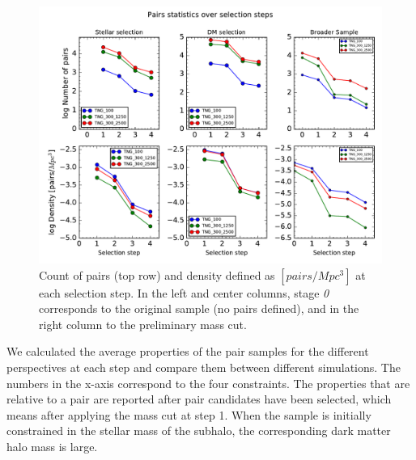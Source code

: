 \documentclass[fleqn,usenatbib]{mnras}
\begin{document}
\begin{figure}
\centering
\includegraphics[scale=0.43]{avgProp/NumberPairs.pdf}
\caption{\label{fig:pairs} Count of pairs (top row) and density defined as $[pairs/Mpc^3]$ at each selection step. In the left and center columns, stage \textit{0} corresponds to the original sample (no pairs defined), and in the right column to the preliminary mass cut.}
\end{figure}
 
 
We calculated the average properties of the pair samples for the different perspectives at each step and compare them between different simulations. The numbers in the x-axis correspond to the four constraints. The properties that are relative to a pair are reported after pair candidates have been selected, which means after applying the mass cut at step 1. 
When the sample is initially constrained in the stellar mass of the subhalo, the corresponding dark matter halo mass is large. 
 
\end{document}

